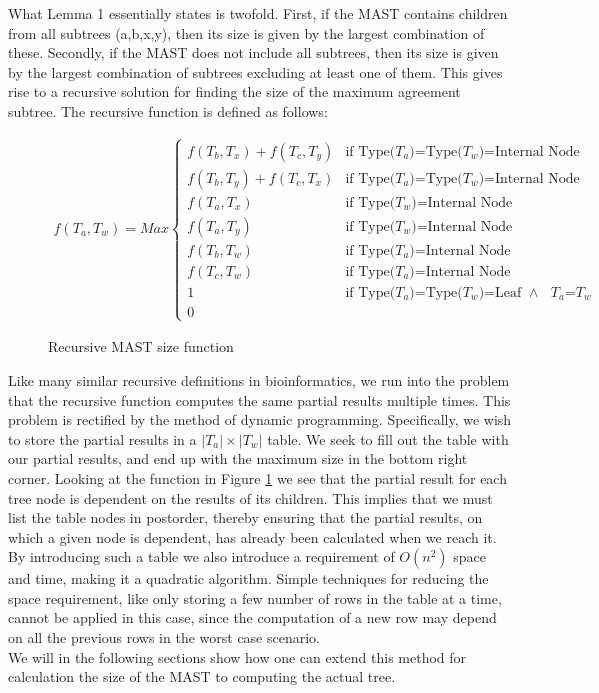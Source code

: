 What Lemma 1 essentially states is twofold. First, if the MAST contains children from all subtrees (a,b,x,y), then its size is given by the largest combination of these. Secondly, if the MAST does not include all subtrees, then its size is given by the largest combination of subtrees excluding at least one of them.    
This gives rise to a recursive solution for finding the size of the maximum agreement subtree. The recursive function is defined as follows: 

\begin{figure}
	\begin{equation*}
	\begin{aligned}
	f(T_a,T_w)=Max
	\begin{cases}
	f(T_b,T_x)+f(T_c,T_y) & \text{if Type($T_a$)=Type($T_w$)=Internal Node}
	\\
	f(T_b,T_y)+f(T_c,T_x) & \text{if Type($T_a$)=Type($T_w$)=Internal Node}
	\\
	f(T_a, T_x)           & \text{if Type($T_w$)=Internal Node}
	\\
	f(T_a, T_y)           & \text{if Type($T_w$)=Internal Node}
	\\
	f(T_b, T_w)           & \text{if Type($T_a$)=Internal Node}
	\\
	f(T_c, T_w)           & \text{if Type($T_a$)=Internal Node}
	\\
	1 	                  & \text{if Type($T_a$)=Type($T_w$)=Leaf  $\land$  $T_a$=$T_w$}
	\\
	0                     
	\end{cases}
	\end{aligned}
	\phantom{\hspace{6cm}}
	\end{equation*}
	\caption{Recursive MAST size function}
	\label{Fig:Function1}
\end{figure}


Like many similar recursive definitions in bioinformatics, we run into the problem that the recursive function computes the same partial results multiple times. This problem is rectified by the method of dynamic programming. Specifically, we wish to store the partial results in a $|T_a| \times |T_w|$ table. We seek to fill out the table with our partial results, and end up with the maximum size in the bottom right corner.
Looking at the function in Figure \ref{Fig:Function1} we see that the partial result for each tree node is dependent on the results of its children. This implies that we must list the table nodes in postorder, thereby ensuring that the partial results, on which a given node is dependent, has already been calculated when we reach it. 
By introducing such a table we also introduce a requirement of $O(n^2)$ space and time, making it a quadratic algorithm. Simple techniques for reducing the space requirement, like only storing a few number of rows in the table at a time, cannot be applied in this case, since the computation of a new row may depend on all the previous rows in the worst case scenario.  
\\
We will in the following sections show how one can extend this method for calculation the size of the MAST to computing the actual tree.

